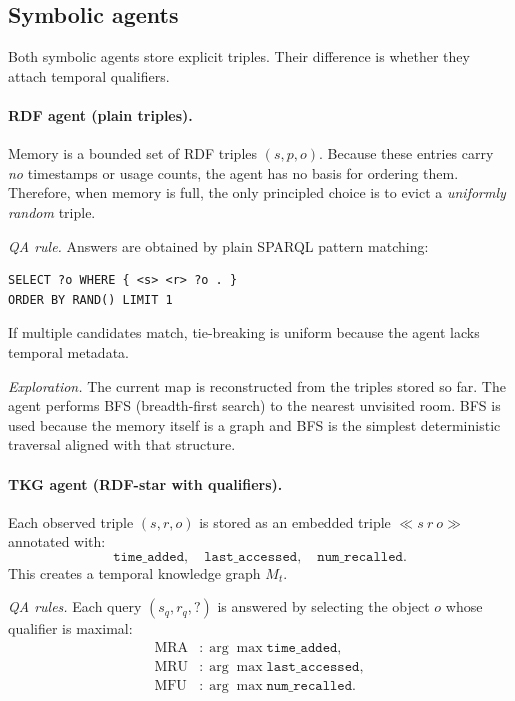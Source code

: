 \documentclass[runningheads]{llncs}
\begin{document}
\subsection{Symbolic agents}

Both symbolic agents store explicit triples. Their difference is whether
they attach temporal qualifiers.

\paragraph{RDF agent (plain triples).}
Memory is a bounded set of RDF triples $(s,p,o)$.
Because these entries carry \emph{no} timestamps or usage counts, the
agent has no basis for ordering them. Therefore, when memory is full, the
only principled choice is to evict a \emph{uniformly random} triple.

\emph{QA rule.} Answers are obtained by plain SPARQL pattern matching:
\begin{lstlisting}[language=SPARQL,basicstyle=\ttfamily\small,frame=single]
SELECT ?o WHERE { <s> <r> ?o . }
ORDER BY RAND() LIMIT 1
\end{lstlisting}
If multiple candidates match, tie-breaking is uniform because the agent
lacks temporal metadata.

\emph{Exploration.}
The current map is reconstructed from the triples stored so far.
The agent performs BFS (breadth-first search) to the nearest unvisited room. BFS is used because the memory itself is a graph and BFS is the simplest deterministic
traversal aligned with that structure.

\paragraph{TKG agent (RDF-star with qualifiers).}
Each observed triple $(s,r,o)$ is stored as an embedded triple
$\ll s\ r\ o\gg$ annotated with:
\[
\texttt{time\_added},\quad \texttt{last\_accessed},\quad
\texttt{num\_recalled}.
\]
This creates a temporal knowledge graph $M_t$.

\emph{QA rules.}  
Each query $(s_q,r_q,?)$ is answered by selecting the object $o$ whose
qualifier is maximal:
\[
\begin{aligned}
\text{MRA} &: \arg\max \texttt{time\_added},\\
\text{MRU} &: \arg\max \texttt{last\_accessed},\\
\text{MFU} &: \arg\max \texttt{num\_recalled}.
\end{aligned}
\]
\end{document}
